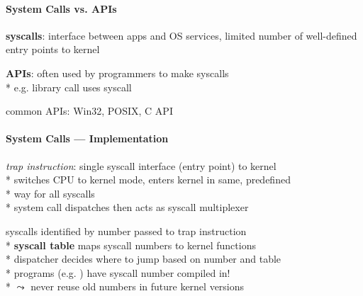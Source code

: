 \paragraph{System Calls vs. APIs}
\begin{items}
	\item \textbf{syscalls}: interface between apps and OS services, limited number of well-defined entry points to kernel
	\item \textbf{APIs}: often used by programmers to make syscalls \\*
		e.g.  library call uses  syscall
	\item common APIs: Win32, POSIX, C API
\end{items}

\paragraph{System Calls --- Implementation}
\begin{items}
	\item \emph{trap instruction}: single syscall interface (entry point) to kernel \\*
		switches CPU to kernel mode, enters kernel in same, predefined \\* \phantom{x} way for all syscalls \\*
		system call dispatches then acts as syscall multiplexer
	\item syscalls identified by number passed to trap instruction \\*
		\textbf{syscall table} maps syscall numbers to kernel functions \\*
		dispatcher decides where to jump based on number and table \\*
		programs (e.g. ) have syscall number compiled in! \\*
		\( \leadsto \) never reuse old numbers in future kernel versions
\end{items}

